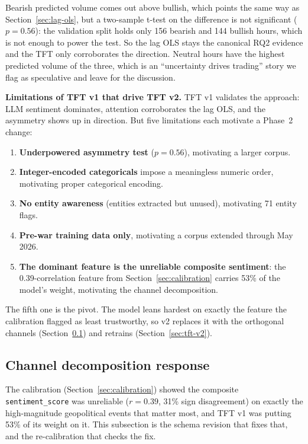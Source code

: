 Bearish predicted volume comes out above bullish, which points the same way as Section~\ref{sec:lag-ols}, but a two-sample t-test on the difference is not significant (\textbf{$p = 0.56$}): the validation split holds only 156 bearish and 144 bullish hours, which is not enough to power the test. So the lag OLS stays the canonical RQ2 evidence and the TFT only corroborates the direction. Neutral hours have the highest predicted volume of the three, which is an ``uncertainty drives trading'' story we flag as speculative and leave for the discussion.

\textbf{Limitations of TFT v1 that drive TFT v2.} TFT v1 validates the approach: LLM sentiment dominates, attention corroborates the lag OLS, and the asymmetry shows up in direction. But five limitations each motivate a Phase~2 change:

\begin{enumerate}
  \item \textbf{Underpowered asymmetry test} ($p = 0.56$), motivating a larger corpus.
  \item \textbf{Integer-encoded categoricals} impose a meaningless numeric order, motivating proper categorical encoding.
  \item \textbf{No entity awareness} (entities extracted but unused), motivating 71 entity flags.
  \item \textbf{Pre-war training data only}, motivating a corpus extended through May 2026.
  \item \textbf{The dominant feature is the unreliable composite sentiment}: the 0.39-correlation feature from Section~\ref{sec:calibration} carries 53\% of the model's weight, motivating the channel decomposition.
\end{enumerate}

The fifth one is the pivot. The model leans hardest on exactly the feature the calibration flagged as least trustworthy, so v2 replaces it with the orthogonal channels (Section~\ref{sec:channel-response}) and retrains (Section~\ref{sec:tft-v2}).

\subsection{Channel decomposition response}\label{sec:channel-response}

The calibration (Section~\ref{sec:calibration}) showed the composite \texttt{sentiment\_score} was unreliable ($r = 0.39$, 31\% sign disagreement) on exactly the high-magnitude geopolitical events that matter most, and TFT v1 was putting 53\% of its weight on it. This subsection is the schema revision that fixes that, and the re-calibration that checks the fix.

